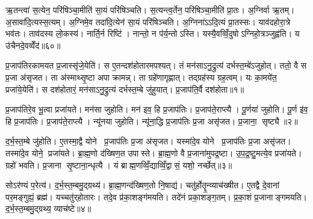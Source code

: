 ऋ॒तन्त्वा॑ स॒त्येन॒ परि॑षिञ्चा॒मीति॑ सा॒यं परि॑षिञ्चति। स॒त्यन्त्व॒र्तेन॒ परि॑षिञ्चा॒मीति॑ प्रा॒तः। अ॒ग्निर्वा ऋ॒तम्। अ॒सावा॑दि॒त्यस्स॒त्यम्। अ॒ग्निमे॒व तदा॑दि॒त्येन॑ सा॒यं परि॑षिञ्चति। अ॒ग्निना॑ऽऽदि॒त्यं प्रा॒तस्सः। याव॑दहोरा॒त्रे भव॑तः। ताव॑दस्य लो॒कस्य॑। नार्ति॒र्न रिष्टि॑। नान्तो॒ न प॑र्य॒न्तोऽस्ति। यस्यै॒वव्विँ॒दुषोऽग्निहो॒त्रञ्जुह्व॑ति। य उ॑चैनदे॒वव्वेँद॑॥६०॥



\clearpage
{}
\setcounter{anuvakam}{0}
प्र॒जाप॑तिरकामयत प्र॒जास्सृ॑जे॒येति॑। स ए॒तन्दश॑होतारमपश्यत्। तं मन॑साऽनु॒द्रुत्य॑ दर्भस्त॒म्बे॑ऽजुहोत्। ततो॒ वै स प्र॒जा अ॑सृजत। ता अ॑स्माथ्सृ॒ष्टा अपाक्रामन्न्। ता ग्रहे॑णागृह्णात्। तद्ग्रह॑स्य ग्रह॒त्वम्। यः का॒मये॑त॒ प्रजा॑ये॒येति॑। स दश॑होतारं॒ मन॑साऽनु॒द्रुत्य॑ दर्भस्त॒म्बे जु॑हुयात्। प्र॒जाप॑ति॒र्वै दश॑होता॥१॥

प्र॒जाप॑तिरे॒व भू॒त्वा प्रजा॑यते। मन॑सा जुहोति। मन॑ इव॒ हि प्र॒जाप॑तिः। प्र॒जाप॑ते॒राप्त्यै। पू॒र्णया॑ जुहोति। पू॒र्ण इ॑व॒ हि प्र॒जाप॑तिः। प्र॒जाप॑ते॒राप्त्यै। न्यू॑नया जुहोति। न्यू॑ना॒द्धि प्र॒जाप॑तिः प्र॒जा असृ॑जत। प्र॒जाना॒ सृष्ट्यै॥२॥

द॒र्भ॒स्त॒म्बे जु॑होति। ए॒तस्मा॒द्वै योने प्र॒जाप॑तिः प्र॒जा अ॑सृजत। यस्मा॑दे॒व योने प्र॒जाप॑तिः प्र॒जा असृ॑जत। तस्मा॑दे॒व योने॒ प्रजा॑यते। ब्रा॒ह्म॒णो द॑ख्षिण॒त उपास्ते। ब्रा॒ह्म॒णो वै प्र॒जाना॑मुपद्र॒ष्टा। उ॒प॒द्र॒ष्टु॒मत्ये॒व प्रजा॑यते। ग्रहो॑ भवति। प्र॒जाना सृ॒ष्टाना॒न्धृत्यै। यं ब्राह्म॒णव्विँ॒द्याव्विँ॒द्वासं॒ यशो॒ नर्च्छेत्॥३॥

सोऽर॑ण्यं प॒रेत्य॑। द॒र्भ॒स्त॒म्बमु॒द्ग्रथ्य॑। ब्रा॒ह्म॒णन्द॑ख्षिण॒तो नि॒षाद्य॑। चतु॑र्होतॄ॒न्व्याच॑ख्षीत। ए॒तद्वै दे॒वानां पर॒मङ्गुह्यं॒ ब्रह्म॑। यच्चतु॑र्‌होतारः। तदे॒व प्र॑का॒शङ्ग॑मयति। तदे॑नं प्रका॒शङ्ग॒तम्। प्र॒का॒शं प्र॒जानाङ्गमयति। द॒र्भ॒स्त॒म्बमु॒द्ग्रथ्य॒ व्याच॑ष्टे॥४॥

